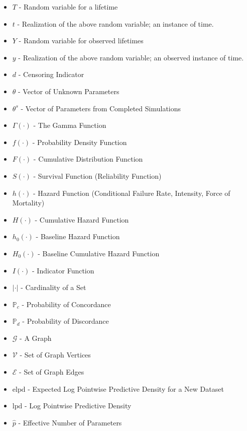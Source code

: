 \begin{itemize}

\item[] $T$ - Random variable for a lifetime
\item[] $t$ - Realization of the above random variable; an instance of time.
\item[] $Y$ - Random variable for observed lifetimes
\item[] $y$ - Realization of the above random variable; an observed instance of time.
\item[] $d$ - Censoring Indicator
\item[] $\theta$ - Vector of Unknown Parameters
\item[] $\theta^s$ - Vector of Parameters from Completed Simulations
\item[] $\Gamma(\cdot)$ - The Gamma Function
\item[] $f(\cdot)$ - Probability Density Function
\item[] $F(\cdot)$ - Cumulative Distribution Function
\item[] $S(\cdot)$ - Survival Function (Reliability Function)
\item[] $h(\cdot)$ - Hazard Function (Conditional Failure Rate, Intensity, Force of Mortality)
\item[] $H(\cdot)$ - Cumulative Hazard Function
\item[] $h_0(\cdot)$ - Baseline Hazard Function
\item[] $H_0(\cdot)$ - Baseline Cumulative Hazard Function
\item[] $I(\cdot)$ - Indicator Function
\item[] $|\cdot|$ - Cardinality of a Set

\item[] $\mathbb{P}_c$ - Probability of Concordance
\item[] $\mathbb{P}_d$ - Probability of Discordance

\item[] $\mathcal{G}$ - A Graph
\item[] $\mathcal{V}$ - Set of Graph Vertices 
\item[] $\mathcal{E}$ - Set of Graph Edges 

\item[] $\text{elpd}$ - Expected Log Pointwise Predictive Density for a New Dataset
\item[] $\text{lpd}$ - Log Pointwise Predictive Density
\item[] $\hat{p}$ - Effective Number of Parameters

\end{itemize}

